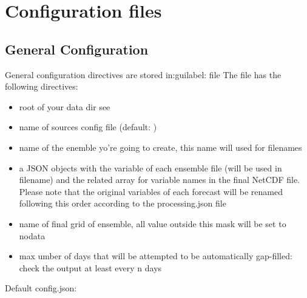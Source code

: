 \documentclass[letterpaper,10pt,english]{sphinxmanual}
\begin{document}
\chapter{Configuration files}
\label{\detokenize{configuration/index:configuration-files}}\label{\detokenize{configuration/index:configuration}}\label{\detokenize{configuration/index::doc}}

\section{General Configuration}
\label{\detokenize{configuration/index:general-configuration}}\label{\detokenize{configuration/index:gen-config}}
General configuration directives are stored in:guilabel: file
The file has the following directives:
\begin{itemize}
\item {} 
 root of your data dir see {\hyperref[\detokenize{howitworks/index:dir-structure}]{}}

\item {} 
 name of sources config file (default: )

\item {} 
 name of the enemble yo’re going to create, this name will used for filenames

\item {} 
 a JSON objects with the variable of each ensemble file (will be used in filename) and the related array for variable names in the final NetCDF file. Please note that the original variables of each forecast will be renamed following this order according to the processing.json file

\item {} 
 name of final grid of ensemble, all value outside this mask will be set to nodata

\item {} 
 max umber of days that will be attempted to be automatically gap-filled: check the output at least every n days

\end{itemize}

Default config.json:
\end{document}
